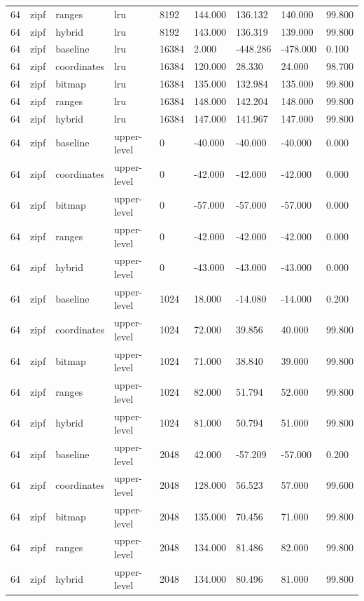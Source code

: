 \begin{tabular}{lllllllll}
64 & zipf & ranges & lru & 8192 & 144.000 & 136.132 & 140.000 & 99.800 \\
64 & zipf & hybrid & lru & 8192 & 143.000 & 136.319 & 139.000 & 99.800 \\
64 & zipf & baseline & lru & 16384 & 2.000 & -448.286 & -478.000 & 0.100 \\
64 & zipf & coordinates & lru & 16384 & 120.000 & 28.330 & 24.000 & 98.700 \\
64 & zipf & bitmap & lru & 16384 & 135.000 & 132.984 & 135.000 & 99.800 \\
64 & zipf & ranges & lru & 16384 & 148.000 & 142.204 & 148.000 & 99.800 \\
64 & zipf & hybrid & lru & 16384 & 147.000 & 141.967 & 147.000 & 99.800 \\
64 & zipf & baseline & upper-level & 0 & -40.000 & -40.000 & -40.000 & 0.000 \\
64 & zipf & coordinates & upper-level & 0 & -42.000 & -42.000 & -42.000 & 0.000 \\
64 & zipf & bitmap & upper-level & 0 & -57.000 & -57.000 & -57.000 & 0.000 \\
64 & zipf & ranges & upper-level & 0 & -42.000 & -42.000 & -42.000 & 0.000 \\
64 & zipf & hybrid & upper-level & 0 & -43.000 & -43.000 & -43.000 & 0.000 \\
64 & zipf & baseline & upper-level & 1024 & 18.000 & -14.080 & -14.000 & 0.200 \\
64 & zipf & coordinates & upper-level & 1024 & 72.000 & 39.856 & 40.000 & 99.800 \\
64 & zipf & bitmap & upper-level & 1024 & 71.000 & 38.840 & 39.000 & 99.800 \\
64 & zipf & ranges & upper-level & 1024 & 82.000 & 51.794 & 52.000 & 99.800 \\
64 & zipf & hybrid & upper-level & 1024 & 81.000 & 50.794 & 51.000 & 99.800 \\
64 & zipf & baseline & upper-level & 2048 & 42.000 & -57.209 & -57.000 & 0.200 \\
64 & zipf & coordinates & upper-level & 2048 & 128.000 & 56.523 & 57.000 & 99.600 \\
64 & zipf & bitmap & upper-level & 2048 & 135.000 & 70.456 & 71.000 & 99.800 \\
64 & zipf & ranges & upper-level & 2048 & 134.000 & 81.486 & 82.000 & 99.800 \\
64 & zipf & hybrid & upper-level & 2048 & 134.000 & 80.496 & 81.000 & 99.800 \\

\end{tabular}
